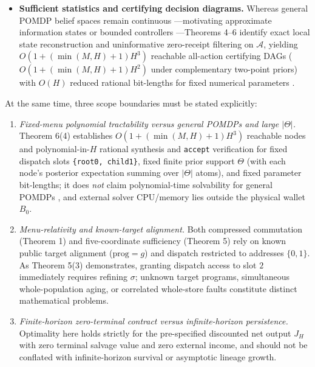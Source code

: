 \documentclass[11pt,letterpaper]{article}
\providecommand{\tightlist}{\setlength{\itemsep}{2pt}\setlength{\parskip}{0pt}}
\begin{document}
\begin{itemize}
  premium (\(d\,\mathrm{Var}(r_\theta)\)), and strictly positive
  post-repair \emph{device-state} feedback
  (\(d^3\mathbb{E}[r_\theta^3(1-r_\theta)]\)) inside the exact subgame
  where \emph{parameter} revelation is worthless
  (\(\mathrm{EVPI}_{\mathrm{post}} = 0\)).
\item
  \textbf{Sufficient statistics and certifying decision diagrams.}
  Whereas general POMDP belief spaces remain continuous
  \citep{smallwoodSondik1973, sondik1978, lovejoy1991, kaelbling1998}---motivating
  approximate information states \citep{subramanian2022} or bounded
  controllers \citep{hansen1998, poupartBoutilier2003}---Theorems 4--6
  identify exact local state reconstruction and uninformative
  zero-receipt filtering on \(\mathcal{A}\), yielding
  \(O(1 + (\min(M, H) + 1)H^3)\) reachable all-action certifying DAGs
  (\(O(1 + (\min(M, H) + 1)H^2)\) under complementary two-point priors)
  with \(O(H)\) reduced rational bit-lengths for fixed numerical
  parameters
  \citep{bryant1986, bahar1997, hoey1999, bergman2016, mcconnell2011}.
\end{itemize}

At the same time, three scope boundaries must be stated explicitly:

\begin{enumerate}
\def\labelenumi{\arabic{enumi}.}
\tightlist
\item
  \emph{Fixed-menu polynomial tractability versus general POMDPs and
  large \(|\Theta|\).} Theorem 6(4) establishes
  \(O(1 + (\min(M, H) + 1)H^3)\) reachable nodes and polynomial-in-\(H\)
  rational synthesis and \texttt{accept} verification for fixed dispatch
  slots \texttt{\{root0,\ child1\}}, fixed finite prior support
  \(\Theta\) (with each node's posterior expectation summing over
  \(|\Theta|\) atoms), and fixed parameter bit-lengths; it does
  \emph{not} claim polynomial-time solvability for general POMDPs
  \citep{papadimitriouTsitsiklis1987, madani2003}, and external solver
  CPU/memory lies outside the physical wallet \(B_0\).
\item
  \emph{Menu-relativity and known-target alignment.} Both compressed
  commutation (Theorem 1) and five-coordinate sufficiency (Theorem 5)
  rely on known public target alignment (\(\mathrm{prog} = g\)) and
  dispatch restricted to addresses \(\{0, 1\}\). As Theorem 5(3)
  demonstrates, granting dispatch access to slot \(2\) immediately
  requires refining \(\sigma\); unknown target programs, simultaneous
  whole-population aging, or correlated whole-store faults constitute
  distinct mathematical problems.
\item
  \emph{Finite-horizon zero-terminal contract versus infinite-horizon
  persistence.} Optimality here holds strictly for the pre-specified
  discounted net output \(J_H\) with zero terminal salvage value and
  zero external income, and should not be conflated with
  infinite-horizon survival or asymptotic lineage growth.
\end{enumerate}
\end{document}
